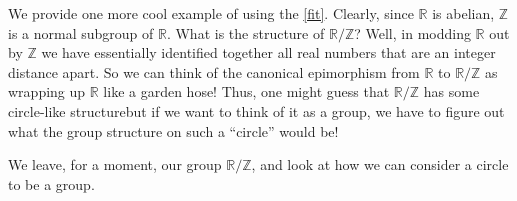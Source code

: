 \documentclass[10pt,]{book}
\theoremstyle{plain}
\theoremstyle{definition}
\theoremstyle{definition}
\theoremstyle{definition}
\theoremstyle{definition}
\numberwithin{equation}{section}
\def\Z{\mathbb{Z}}
\def\R{\mathbb{R}}
\begin{document}
    We provide one more cool example of using the \hyperref[fit]{\ref{fit}}. Clearly, since \(\R\) is abelian, \(\Z\) is a normal
    subgroup of \(\R\). What is the structure of \(\R/\Z\)? Well, in
    modding \(\R\) out by \(\Z\) we have essentially identified together
    all real numbers that are an integer distance apart. So we can
    think of the canonical epimorphism from \(\R\) to \(\R/\Z\) as
    wrapping up \(\R\) like a garden hose! Thus, one might guess that
    \(\R/\Z\) has some circle-like structure\textemdash{}but if we want to think
    of it as a group, we have to figure out what the group structure on
    such a ``circle'' would be!
\par

    We leave, for a moment, our group \(\R/\Z\), and look at how we can
    consider a circle to be a group.
\par
\end{document}
